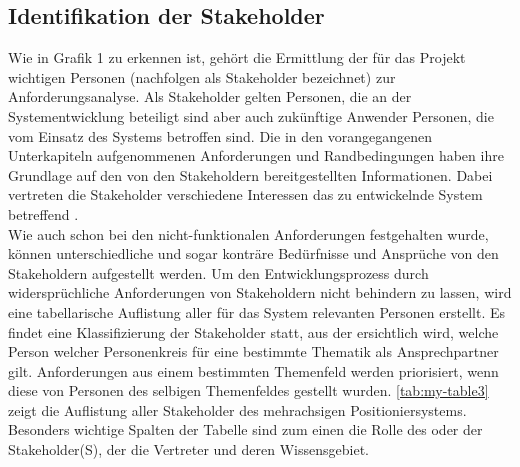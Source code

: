 \documentclass[../../../Bachelorarbeit.tex]{subfiles}
\begin{document}
\clearpage
\subsection{Identifikation der Stakeholder} \label{stakeholder}
Wie in Grafik 1 zu erkennen ist, gehört die Ermittlung der für das Projekt wichtigen Personen (nachfolgen als Stakeholder bezeichnet) zur Anforderungsanalyse. Als Stakeholder gelten Personen, die an der Systementwicklung beteiligt sind aber auch zukünftige Anwender \bzw Personen, die vom Einsatz des Systems betroffen sind. Die in den vorangegangenen Unterkapiteln aufgenommenen Anforderungen und Randbedingungen haben ihre Grundlage auf den von den Stakeholdern bereitgestellten Informationen. Dabei vertreten die Stakeholder verschiedene Interessen das zu entwickelnde System betreffend \cite[56]{Kleuker2013}.\\
Wie auch schon bei den nicht-funktionalen Anforderungen festgehalten wurde, können unterschiedliche und sogar konträre Bedürfnisse und Ansprüche von den Stakeholdern aufgestellt werden. Um den Entwicklungsprozess durch widersprüchliche Anforderungen von Stakeholdern nicht behindern zu lassen, wird eine tabellarische Auflistung aller für das System relevanten Personen erstellt. Es findet eine Klassifizierung der Stakeholder statt, aus der ersichtlich wird, welche Person \bzw welcher Personenkreis für eine bestimmte Thematik als Ansprechpartner gilt. Anforderungen aus einem bestimmten Themenfeld werden priorisiert, wenn diese von Personen des selbigen Themenfeldes gestellt wurden. \autoref{tab:my-table3} zeigt die Auflistung aller Stakeholder des mehrachsigen Positioniersystems. Besonders wichtige Spalten der Tabelle sind zum einen die Rolle des oder der Stakeholder(S), der \bzw die Vertreter und deren Wissensgebiet.\\
\end{document}

